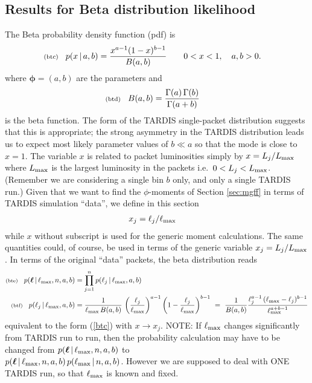\documentclass[11pt]{article}
\newcommand{\lleq}[1]{\label{#1} }
\renewcommand{\lleq}[1]{\label{#1} {\scriptstyle {\rm (#1)}} \hspace*{2ex} }
\newcommand{\cond}{\,|\,}
\newcommand{\bml}{{\bm{\ell}}}
\newcommand{\bmphi}{{\bm{\phi}}}
\begin{document}
\subsection{Results for Beta distribution likelihood}

The Beta probability density function (pdf) is
\begin{align}
  \lleq{btc}
  p(x\cond a,b) &= \frac{x^{a-1}(1-x)^{b-1}}{B(a,b)} \qquad
  0 < x < 1, \quad a,b > 0.
\end{align}
where $\bmphi = (a,b)$ are the parameters and
\begin{align}
  \lleq{btd}
  B(a,b) &= \frac{\Gamma(a)\,\Gamma(b)}{\Gamma(a+b)}
\end{align}
is the beta function.
%
The form of the TARDIS single-packet distribution suggests that this
is appropriate; the strong asymmetry in the TARDIS distribution leads
us to expect most likely parameter values of $b \ll a$ so that the mode
is close to $x=1$.
%
The variable $x$ is related to packet luminosities simply by
$x = L_j/L_{\rm max}$ where $L_{\rm max}$ is the largest luminosity
in the packets i.e.\ $0 < L_j < L_{\rm max}$.
%
(Remember we are considering a single bin $b$ only, and only a single
TARDIS run.)
%
Given that we want to find the $\phi$-moments of Section \ref{sec:mgff}
in terms of TARDIS simulation ``data'', we define in this section
\begin{align}
  x_j &= \ell_j/\ell_{\rm max}
\end{align}
while $x$ without subscript is used for the generic moment
calculations. The same quantities could, of course, be used in terms
of the generic variable $x_j = L_j/L_{\rm max}$. In terms of the
original ``data'' packets, the beta distribution reads
\begin{align}
  \lleq{bte}
  p(\bml\cond \ell_{\rm max},n,a,b)
  &= \prod_{j=1}^n p(\ell_j\cond \ell_{\rm max},a,b) \\
  \lleq{btf}
  p(\ell_j\cond \ell_{\rm max},a,b)
  &= \frac{1}{\ell_{\rm max}\,B(a,b)}
  \,\left(\frac{\ell_j}{\ell_{\rm max}}\right)^{a-1}
    \left(1-\frac{\ell_j}{\ell_{\rm max}}\right)^{b-1}
  \ =\ \frac{1}{B(a,b)}
  \frac{\ell_j^{a-1}\,(\ell_{\rm max}-\ell_j)^{b-1}}
  {\ell_{\rm max}^{a+b-1}}
\end{align}
equivalent to the form (\ref{btc}) with $x\to x_j$.
NOTE: If $\ell_{\rm max}$ changes significantly from TARDIS run to
run, then the probability calculation may have to be changed from
$p(\bml\cond \ell_{\rm max},n,a,b)$ to\\
$p(\bml\cond \ell_{\rm max},n,a,b)\,p(\ell_{\rm max}\cond
n,a,b)$. However we are supposed to deal with ONE TARDIS run, so that
$\ell_{\rm max}$ is known and fixed.
\\
\end{document}
